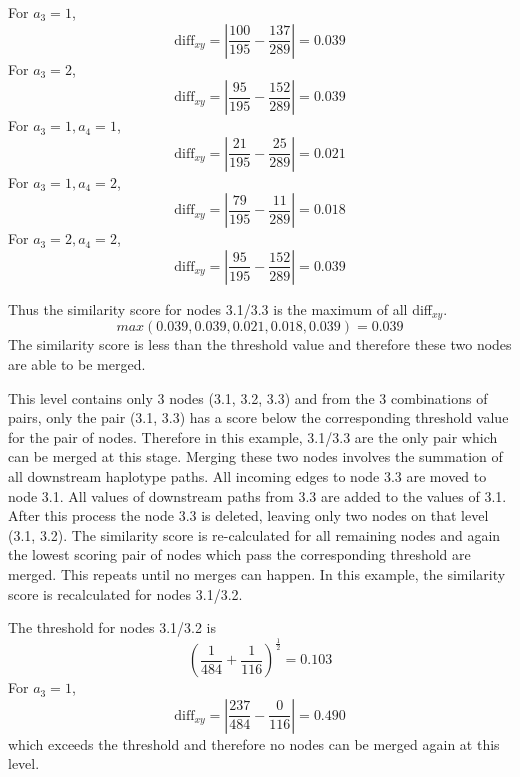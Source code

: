 \documentclass[a4paper,11pt,twoside,abstraction,titlepage]{article}
\begin{document}
\noindent For $a_3=1$,
\begin{equation*}
\mbox{diff}_{xy} =\left|\frac{100}{195}-\frac{137}{289}\right| = 0.039 
\end{equation*}
For $a_3=2$,
\begin{equation*}
\mbox{diff}_{xy} =\left|\frac{95}{195}-\frac{152}{289}\right| = 0.039
\end{equation*}
For $a_3=1, a_4=1$,
\begin{equation*}
\mbox{diff}_{xy} =\left|\frac{21}{195}-\frac{25}{289}\right| = 0.021
\end{equation*}
For $a_3=1, a_4=2$,
\begin{equation*}
\mbox{diff}_{xy} =\left|\frac{79}{195}-\frac{11}{289}\right| = 0.018
\end{equation*}
For $a_3=2, a_4=2$,
\begin{equation*}
\mbox{diff}_{xy} =\left|\frac{95}{195}-\frac{152}{289}\right| = 0.039
\end{equation*}
\vspace{1pt}

\noindent Thus the similarity score for nodes 3.1/3.3 is the maximum of all diff$_{xy}$.
\begin{equation*}
max(0.039, 0.039, 0.021, 0.018, 0.039) = 0.039
\end{equation*}
The similarity score is less than the threshold value and therefore these two nodes are able to be merged.

This level contains only 3 nodes (3.1, 3.2, 3.3) and from the 3 combinations of pairs, only the pair (3.1, 3.3) has a score below the corresponding threshold value for the pair of nodes.  Therefore in this example, 3.1/3.3 are the only pair which can be merged at this stage.  Merging these two nodes involves the summation of all downstream haplotype paths.  All incoming edges to node 3.3 are moved to node 3.1.  All values of downstream paths from 3.3 are added to the values of 3.1.  After this process the node 3.3 is deleted, leaving only two nodes on that level (3.1, 3.2).  The similarity score is re-calculated for all remaining nodes and again the lowest scoring pair of nodes which pass the corresponding threshold are merged.  This repeats until no merges can happen.  In this example, the similarity score is recalculated for nodes 3.1/3.2.

\vspace{10pt}

\noindent The threshold for nodes 3.1/3.2 is
\vspace{-5pt}
\begin{equation*}
\left(\frac{1}{484}+\frac{1}{116}\right)^{\frac{1}{2}} = 0.103
\end{equation*}
For $a_3=1$,
\begin{equation*}
\mbox{diff}_{xy} = \left|\frac{237}{484}-\frac{0}{116}\right| = 0.490
\end{equation*}
which exceeds the threshold and therefore no nodes can be merged again at this level.
\vspace{8pt}
\end{document}
